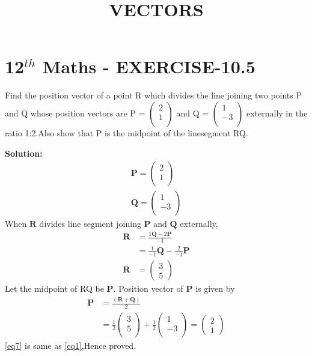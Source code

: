 \documentclass[10pt]{article}
\newcommand{\solution}{\noindent \textbf{Solution: }}
\newcommand{\myvec}[1]{\ensuremath{\begin{pmatrix}#1\end{pmatrix}}}
\let\vec\mathbf{}
\begin{document}
\begin{center}
\title{\textbf{VECTORS}}
\date{\vspace{-5ex}} %
\maketitle
\end{center}

\section*{12$^{th}$ Maths - EXERCISE-10.5}

Find the position vector of a point R which divides the line joining two points  P and Q whose position vectors are P = $\myvec{2\\ 1 \\}$ and Q = $\myvec{ 1\\-3\\ }$  externally in the ratio 1:2.Also show that P is the midpoint of the linesegment RQ.

\solution
\begin{align}
\vec{P} = \myvec{ 2\\1\\} 
 \label{eq1} \\
 \vec{Q} = \myvec{ 1\\-3\\}
\end{align}
 When $\vec{R}$ divides line segment joining $\vec{P}$ and $\vec{Q}$ externally,
\begin{align}
\vec{R} &= \frac{1\vec{Q} -2\vec{P}}{-1} \\
 &= \frac{1}{-1} \vec{Q} -\frac{2}{-1} \vec{P}\\
\vec{R} &= \myvec{3\\5}
\end{align}
Let the midpoint of RQ  be $\vec{P}$.
Position vector of $\vec{P}$ is given by
\begin{align}
 \vec{P} &= \frac{ (\vec{R} + \vec{Q})}{2}\\
&=\frac{1}{2}\myvec{3\\5\\} +  \frac{1}{2}\myvec{1\\-3\\} =\myvec{2\\1} 
 \label{eq7}
\end{align}
\eqref{eq7} is same as \eqref{eq1},Hence proved.
\end{document}
